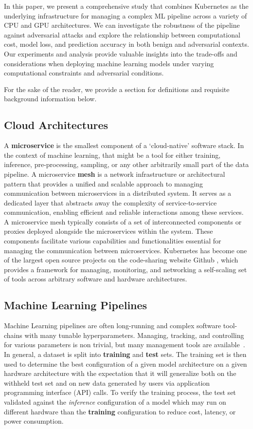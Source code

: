 \documentclass[conference]{IEEEtran}
\begin{document}
In this paper, we present a comprehensive study that combines Kubernetes as the underlying infrastructure for managing a complex ML pipeline across a variety of CPU and GPU architectures. We can investigate the robustness of the pipeline against adversarial attacks and explore the relationship between computational cost, model loss, and  prediction accuracy in both benign and adversarial contexts. Our experiments and analysis provide valuable insights into the trade-offs and considerations when deploying machine learning models under varying computational constraints and adversarial conditions.


For the sake of the reader, we provide a section for definitions and requisite background information below.

\subsection{Cloud Architectures}
A \textbf{microservice} is the smallest component of a `cloud-native' software stack. In the context of machine learning, that might be a tool for either training, inference, pre-processing, sampling, or any other arbitrarily small part of the data pipeline. A microservice \textbf{mesh} is a network infrastructure or architectural pattern that provides a unified and scalable approach to managing communication between microservices in a distributed system. It serves as a dedicated layer that abstracts away the complexity of service-to-service communication, enabling efficient and reliable interactions among these services. A microservice mesh typically consists of a set of interconnected components or proxies deployed alongside the microservices within the system. These components facilitate various capabilities and functionalities essential for managing the communication between microservices. Kubernetes has become one of the largest open source projects on the code-sharing website Github \cite{k8s-size}, which provides a framework for managing, monitoring, and networking a self-scaling set of tools across arbitrary software and hardware architectures.

\subsection{Machine Learning Pipelines}
Machine Learning pipelines are often long-running and complex software tool-chains with many tunable hyperparameters. Managing, tracking, and controlling for various parameters is non trivial, but many management tools are available~\cite{dvc, hydra, k8s}. In general, a dataset is split into \textbf{training} and \textbf{test} sets. The training set is then used to determine the best configuration of a given model architecture on a given hardware architecture with the expectation that it will generalize both on the withheld test set and on new data generated by users via application programming interface (API) calls. To verify the training process, the test set validated against the \textit{inference} configuration of a model which may run on different hardware than the \textbf{training} configuration to reduce cost, latency, or power consumption. 
\end{document}
